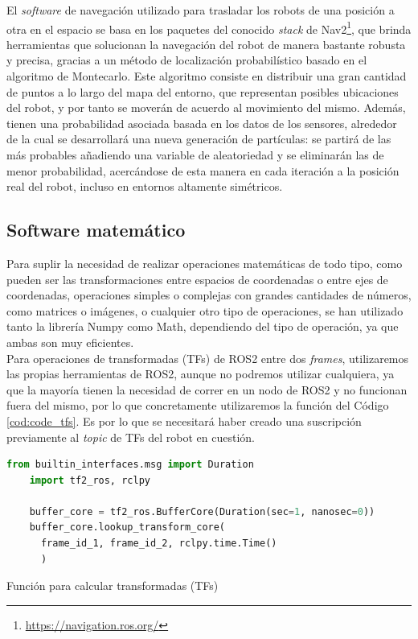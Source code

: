 El \textit{software} de navegación utilizado para trasladar los robots de una
posición a otra en el espacio se basa en los paquetes del conocido
\textit{stack} de Nav2\footnote{\url{https://navigation.ros.org/}}, que brinda
herramientas que solucionan la navegación del robot de manera bastante robusta y
precisa, gracias a un método de localización probabilístico basado en el
algoritmo de Montecarlo.
Este algoritmo consiste en distribuir una gran cantidad de puntos a lo largo del
mapa del entorno, que representan posibles ubicaciones del robot, y por tanto se
moverán de acuerdo al movimiento del mismo.
Además, tienen una probabilidad asociada basada en los datos de los sensores,
alrededor de la cual se desarrollará una nueva generación de partículas: se
partirá de las más probables añadiendo una variable de aleatoriedad y se
eliminarán las de menor probabilidad, acercándose de esta manera en cada
iteración a la posición real del robot, incluso en entornos altamente
simétricos.
\\


\subsection{Software matemático}
\label{sec:software_matematico}

Para suplir la necesidad de realizar operaciones matemáticas de todo tipo, como
pueden ser las transformaciones entre espacios de coordenadas o entre ejes de
coordenadas, operaciones simples o complejas con grandes cantidades de números,
como matrices o imágenes, o cualquier otro tipo de operaciones, se han utilizado
tanto la librería Numpy como Math, dependiendo del tipo de operación, ya que
ambas son muy eficientes.
\\

Para operaciones de transformadas (TFs) de ROS2 entre dos \textit{frames},
utilizaremos las propias herramientas de ROS2, aunque no podremos utilizar
cualquiera, ya que la mayoría tienen la necesidad de correr en un nodo de ROS2
y no funcionan fuera del mismo, por lo que concretamente utilizaremos la
función del Código \ref{cod:code_tfs}.
Es por lo que se necesitará haber creado una suscripción previamente al
\textit{topic} de TFs del robot en cuestión.
\\

\begin{code}[h!]
  \begin{lstlisting}[language=Python]
    from builtin_interfaces.msg import Duration
    import tf2_ros, rclpy

    buffer_core = tf2_ros.BufferCore(Duration(sec=1, nanosec=0))
    buffer_core.lookup_transform_core(
      frame_id_1, frame_id_2, rclpy.time.Time()
      )
  \end{lstlisting}
  \caption[Función para calcular transformadas]{Función para calcular transformadas (TFs)}
  \label{cod:code_tfs}
\end{code}


